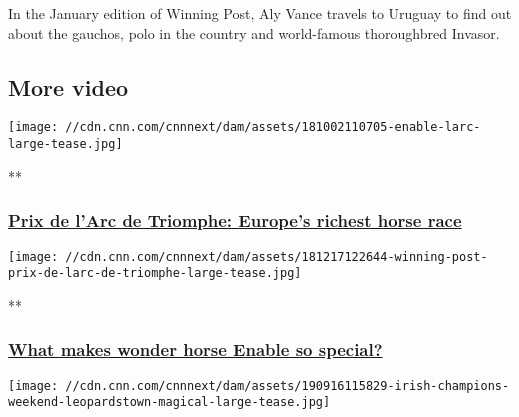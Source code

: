 In the January edition of Winning Post, Aly Vance travels to Uruguay to
find out about the gauchos, polo in the country and world-famous
thoroughbred Invasor.

\hypertarget{more-video-}{%
\subsection{More video~}\label{more-video-}}

\href{/videos/sports/2019/09/30/prix-de-larc-de-triomphe-longchamp-2019-frankie-dettori-enable-spt-intl.cnn}{}

\texttt{[image: //cdn.cnn.com/cnnnext/dam/assets/181002110705-enable-larc-large-tease.jpg]}

**

\hypertarget{prix-de-larc-de-triomphe-europes-richest-horse-race}{%
\subsubsection{\texorpdfstring{\href{/videos/sports/2019/09/30/prix-de-larc-de-triomphe-longchamp-2019-frankie-dettori-enable-spt-intl.cnn}{Prix
de l'Arc de Triomphe: Europe's richest horse
race}}{Prix de l'Arc de Triomphe: Europe's richest horse race}}\label{prix-de-larc-de-triomphe-europes-richest-horse-race}}

\href{/videos/sports/2019/09/30/enable-frankie-dettori-john-gosden-prix-de-larc-de-triomphe-vision-spt-intl.cnn}{}

\texttt{[image: //cdn.cnn.com/cnnnext/dam/assets/181217122644-winning-post-prix-de-larc-de-triomphe-large-tease.jpg]}

**

\hypertarget{what-makes-wonder-horse-enable-so-special}{%
\subsubsection{\texorpdfstring{\href{/videos/sports/2019/09/30/enable-frankie-dettori-john-gosden-prix-de-larc-de-triomphe-vision-spt-intl.cnn}{What
makes wonder horse Enable so
special?}}{What makes wonder horse Enable so special?}}\label{what-makes-wonder-horse-enable-so-special}}

\href{/videos/sports/2019/09/12/longines-irish-champions-weekend-leopardstown-curragh-vision-spt-intl-lon-orig.cnn}{}

\texttt{[image: //cdn.cnn.com/cnnnext/dam/assets/190916115829-irish-champions-weekend-leopardstown-magical-large-tease.jpg]}

